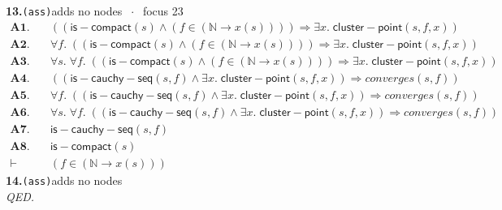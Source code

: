 \documentclass[11pt]{article}
\begin{document}
\medskip\noindent\textbf{13.}\quad \texttt{(ass)}\hfill{\small adds no nodes $\;\cdot\;$ focus 23}\\[2pt]
\begin{align*}
  \mathbf{A1.}\quad & ((\mathsf{is{-}compact}(s) \wedge (f \in (\mathbb{N} \to x(s)))) \Rightarrow \exists x.\; \mathsf{cluster{-}point}(s, f, x)) \\
  \mathbf{A2.}\quad & \forall f.\; ((\mathsf{is{-}compact}(s) \wedge (f \in (\mathbb{N} \to x(s)))) \Rightarrow \exists x.\; \mathsf{cluster{-}point}(s, f, x)) \\
  \mathbf{A3.}\quad & \forall s.\; \forall f.\; ((\mathsf{is{-}compact}(s) \wedge (f \in (\mathbb{N} \to x(s)))) \Rightarrow \exists x.\; \mathsf{cluster{-}point}(s, f, x)) \\
  \mathbf{A4.}\quad & ((\mathsf{is{-}cauchy{-}seq}(s, f) \wedge \exists x.\; \mathsf{cluster{-}point}(s, f, x)) \Rightarrow \mathit{converges}(s, f)) \\
  \mathbf{A5.}\quad & \forall f.\; ((\mathsf{is{-}cauchy{-}seq}(s, f) \wedge \exists x.\; \mathsf{cluster{-}point}(s, f, x)) \Rightarrow \mathit{converges}(s, f)) \\
  \mathbf{A6.}\quad & \forall s.\; \forall f.\; ((\mathsf{is{-}cauchy{-}seq}(s, f) \wedge \exists x.\; \mathsf{cluster{-}point}(s, f, x)) \Rightarrow \mathit{converges}(s, f)) \\
  \mathbf{A7.}\quad & \mathsf{is{-}cauchy{-}seq}(s, f) \\
  \mathbf{A8.}\quad & \mathsf{is{-}compact}(s) \\
  \vdash\quad & (f \in (\mathbb{N} \to x(s)))
\end{align*}
\medskip\noindent\textbf{14.}\quad \texttt{(ass)}\hfill{\small adds no nodes}\\[2pt]
\emph{QED.}\par
\end{document}
